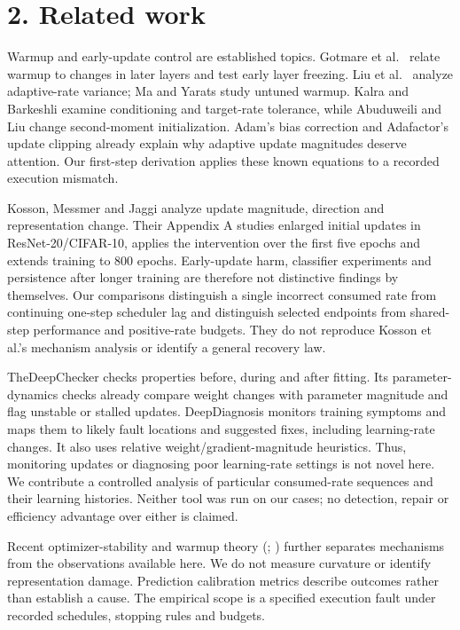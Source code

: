 \documentclass[smallextended]{svjour3}
\begin{document}
\section{2. Related work}\label{related-work}

Warmup and early-update control are established topics. Gotmare et al.~\citep{gotmare2019heuristics} relate warmup to changes in later layers and test early layer freezing. Liu et al.~\citep{liu2020variance} analyze adaptive-rate variance; Ma and Yarats \citep{ma2021untuned} study untuned warmup. Kalra and Barkeshli \citep{kalra2024warmup} examine conditioning and target-rate tolerance, while Abuduweili and Liu \citep{abuduweili2025initial} change second-moment initialization. Adam's bias correction \citep{kingma2015adam} and Adafactor's update clipping \citep{shazeer2018adafactor} already explain why adaptive update magnitudes deserve attention. Our first-step derivation applies these known equations to a recorded execution mismatch.

Kosson, Messmer and Jaggi \citep{kosson2024warmup} analyze update magnitude, direction and representation change. Their Appendix A studies enlarged initial updates in ResNet-20/CIFAR-10, applies the intervention over the first five epochs and extends training to 800 epochs. Early-update harm, classifier experiments and persistence after longer training are therefore not distinctive findings by themselves. Our comparisons distinguish a single incorrect consumed rate from continuing one-step scheduler lag and distinguish selected endpoints from shared-step performance and positive-rate budgets. They do not reproduce Kosson et al.'s mechanism analysis or identify a general recovery law.

TheDeepChecker \citep{benbraiek2023deepchecker} checks properties before, during and after fitting. Its parameter-dynamics checks already compare weight changes with parameter magnitude and flag unstable or stalled updates. DeepDiagnosis \citep{wardat2022deepdiagnosis} monitors training symptoms and maps them to likely fault locations and suggested fixes, including learning-rate changes. It also uses relative weight/gradient-magnitude heuristics. Thus, monitoring updates or diagnosing poor learning-rate settings is not novel here. We contribute a controlled analysis of particular consumed-rate sequences and their learning histories. Neither tool was run on our cases; no detection, repair or efficiency advantage over either is claimed.

Recent optimizer-stability and warmup theory (\citep{bai2026spikes}; \citep{alimisis2026warmup}) further separates mechanisms from the observations available here. We do not measure curvature or identify representation damage. Prediction calibration metrics \citep{guo2017calibration} describe outcomes rather than establish a cause. The empirical scope is a specified execution fault under recorded schedules, stopping rules and budgets.
\end{document}
